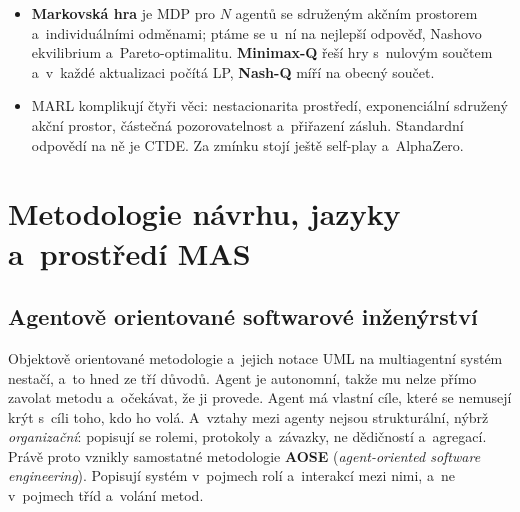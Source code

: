 \documentclass[11pt,a4paper]{article}
\theoremstyle{definition}
\begin{document}
\begin{itemize}
  optimální politiku zaručeně nemění jen potenciálový tvar $F = \gamma\Phi(s')-\Phi(s)$.
\item \textbf{Markovská hra} je MDP pro $N$ agentů se sdruženým akčním prostorem
  a~individuálními odměnami; ptáme se u~ní na nejlepší odpověď, Nashovo ekvilibrium
  a~Pareto-optimalitu. \textbf{Minimax-Q} řeší hry s~nulovým součtem a~v~každé aktualizaci
  počítá LP, \textbf{Nash-Q} míří na obecný součet.
\item MARL komplikují čtyři věci: nestacionarita prostředí, exponenciální sdružený akční
  prostor, částečná pozorovatelnost a~přiřazení zásluh. Standardní odpovědí na ně je CTDE.
  Za zmínku stojí ještě self-play a~AlphaZero.
\end{itemize}


\section{Metodologie návrhu, jazyky a~prostředí MAS}
\label{sec:metodologie}

\subsection{Agentově orientované softwarové inženýrství}
Objektově orientované metodologie a~jejich notace UML na multiagentní systém nestačí, a~to
hned ze tří důvodů. Agent je autonomní, takže mu nelze přímo zavolat metodu a~očekávat, že ji
provede. Agent má vlastní cíle, které se nemusejí krýt s~cíli toho, kdo ho volá. A~vztahy mezi
agenty nejsou strukturální, nýbrž \emph{organizační}: popisují se rolemi, protokoly a~závazky,
ne dědičností a~agregací. Právě proto vznikly samostatné metodologie \textbf{AOSE}
(\emph{agent-oriented software engineering}). Popisují systém v~pojmech rolí a~interakcí mezi
nimi, a~ne v~pojmech tříd a~volání metod.
\end{document}
